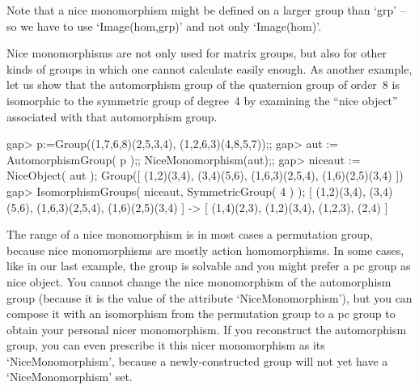 Note that a nice monomorphism might be defined on a larger group than `grp'
-- so we have to use `Image(hom,grp)' and not only `Image(hom)'.

%

Nice monomorphisms are not only used for matrix groups, but also for
other kinds of groups in which one cannot calculate easily enough. As
another example, let us show that the automorphism group of the
quaternion group of order~8 is isomorphic to the symmetric group of
degree~4  by examining the ``nice object'' associated with that
automorphism group.

\beginexample
gap> p:=Group((1,7,6,8)(2,5,3,4), (1,2,6,3)(4,8,5,7));;
gap> aut := AutomorphismGroup( p );; NiceMonomorphism(aut);;
gap> niceaut := NiceObject( aut );
Group([ (1,2)(3,4), (3,4)(5,6), (1,6,3)(2,5,4), (1,6)(2,5)(3,4) ])
gap> IsomorphismGroups( niceaut, SymmetricGroup( 4 ) );
[ (1,2)(3,4), (3,4)(5,6), (1,6,3)(2,5,4), (1,6)(2,5)(3,4) ] -> 
[ (1,4)(2,3), (1,2)(3,4), (1,2,3), (2,4) ]
\endexample

%

The range of  a nice monomorphism is  in most cases a permutation  group,
because  nice monomorphisms  are mostly action  homomorphisms. In some
cases,  like in  our last example,  the  group is solvable  and you might
prefer a pc group as nice object. You cannot change the nice monomorphism
of  the automorphism  group (because it  is   the value  of the attribute
`NiceMonomorphism'), but you can compose  it with an isomorphism from the
permutation  group to  a  pc   group  to   obtain your  personal    nicer
monomorphism. If  you reconstruct  the automorphism  group,  you can even
prescribe it this nicer monomorphism as its `NiceMonomorphism', because a
newly-constructed group will not yet have a `NiceMonomorphism' set.


